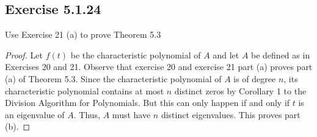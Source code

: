\subsection*{Exercise 5.1.24} Use Exercise 21 (a) to prove Theorem 5.3
\begin{proof}
Let \( f(t)  \) be the characteristic polynomial of \( A  \) and let \( A  \) be defined as in Exercises 20 and 21. Observe that exercise 20 and exercise 21 part (a) proves part (a) of Theorem 5.3. Since the characteristic polynomial of \( A  \) is of degree \( n  \), its characteristic polynomial contains at most \( n  \) distinct zeros by Corollary 1 to the Division Algorithm for Polynomials.  But this can only happen if and only if \( t  \) is an eigenvalue of \( A  \). Thus, \( A  \) must have \( n  \) distinct eigenvalues. This proves part (b).
\end{proof}
